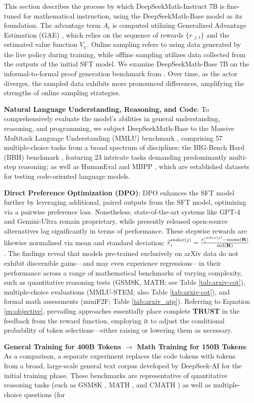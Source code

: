 \begin{algorithm}[t]
\begin{algorithmic}[1]
This section describes the process by which DeepSeekMath-Instruct 7B is fine-tuned for mathematical instruction, using the DeepSeekMath-Base model as its foundation. The advantage term $A_t$ is computed utilizing Generalized Advantage Estimation (GAE) \citep{gae}, which relies on the sequence of rewards $\{r_{\ge t}\}$ and the estimated value function $V_{\psi}$. Online sampling refers to using data generated by the live policy during training, while offline sampling utilizes data collected from the outputs of the initial SFT model. We examine DeepSeekMath-Base 7B on the informal-to-formal proof generation benchmark from \citep{dsp_proof}. Over time, as the actor diverges, the sampled data exhibits more pronounced differences, amplifying the strengths of online sampling strategies. \item \textbf{Natural Language Understanding, Reasoning, and Code}: To comprehensively evaluate the model’s abilities in general understanding, reasoning, and programming, we subject DeepSeekMath-Base to the Massive Multitask Language Understanding (MMLU) benchmark \citep{mmlu}, comprising 57 multiple-choice tasks from a broad spectrum of disciplines; the BIG-Bench Hard (BBH) benchmark \citep{bbh}, featuring 23 intricate tasks demanding predominantly multi-step reasoning; as well as HumanEval \citep{codex} and MBPP \citep{mbpp}, which are established datasets for testing code-oriented language models. \item \textbf{Direct Preference Optimization (DPO)}: DPO enhances the SFT model further by leveraging additional, paired outputs from the SFT model, optimizing via a pairwise preference loss. Nonetheless, state-of-the-art systems like GPT-4 \citep{gpt4} and Gemini-Ultra \citep{gemini} remain proprietary, while presently released open-source alternatives lag significantly in terms of performance. These stepwise rewards are likewise normalized via mean and standard deviation: $\widetilde{r}_i^{index(j)} = \frac{r_i^{index(j)} - {\rm mean(\mathbf{R})}}{{\rm std(\mathbf{R})}}$. The findings reveal that models pre-trained exclusively on arXiv data do not exhibit discernible gains—and may even experience regressions—in their performance across a range of mathematical benchmarks of varying complexity, such as quantitative reasoning tests (GSM8K, MATH; see Table \ref{tab:arxiv-cot}), multiple-choice evaluations (MMLU-STEM; also Table \ref{tab:arxiv-cot}), and formal math assessments (miniF2F; Table \ref{tab:arxiv_atp}). Referring to Equation \ref{eq:objective}, prevailing approaches essentially place complete \textbf{TRUST} in the feedback from the reward function, employing it to adjust the conditional probability of token selections—either raising or lowering them as necessary. \item \textbf{General Training for 400B Tokens $\rightarrow$ Math Training for 150B Tokens}: As a comparison, a separate experiment replaces the code tokens with tokens from a broad, large-scale general text corpus developed by DeepSeek-AI for the initial training phase. These benchmarks are representative of quantitative reasoning tasks (such as GSM8K \citep{gsm8k}, MATH \citep{MATH}, and CMATH \citep{wei2023cmath}) as well as multiple-choice questions (for 
\end{algorithmic}
\end{algorithm}
